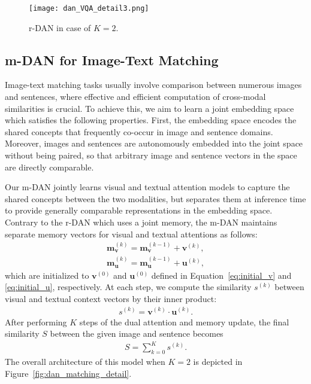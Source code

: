 \documentclass[10pt,twocolumn,letterpaper]{article}
\begin{document}
\begin{figure}[t]
\begin{center}
\texttt{[image: dan\_VQA\_detail3.png]}
\caption{
r-DAN in case of $K=2$.
}
\label{fig:dan_vqa_detail}
\vspace{-5mm}
\end{center}
\end{figure}

\subsection{m-DAN for Image-Text Matching}
\label{sub:matching}
Image-text matching tasks usually involve comparison between numerous images and sentences, where effective and efficient computation of cross-modal similarities is crucial.
To achieve this, we aim to learn a joint embedding space which satisfies the following properties.
First, the embedding space encodes the shared concepts that frequently co-occur in image and sentence domains.
Moreover, images and sentences are autonomously embedded into the joint space without being paired, so that arbitrary image and sentence vectors in the  space are directly comparable.





Our m-DAN jointly learns visual and textual attention models to capture the shared concepts between the two modalities, but separates them at inference time to provide generally comparable representations in the embedding space.
Contrary to the r-DAN which uses a joint memory, the m-DAN maintains separate memory vectors for visual and textual attentions as follows:
\begin{align}
\mathbf{m}_\mathbf{v}^{(k)} = \mathbf{m}_\mathbf{v}^{(k-1)} + \mathbf{v}^{(k)}, \\
\mathbf{m}_\mathbf{u}^{(k)} = \mathbf{m}_\mathbf{u}^{(k-1)} + \mathbf{u}^{(k)},
\label{eq:mem_matching}
\end{align}
which are initialized to $\mathbf{v}^{(0)}$ and $\mathbf{u}^{(0)}$ defined in Equation~\ref{eq:initial_v} and \ref{eq:initial_u}, respectively.
At each step, we compute the similarity $s^{(k)}$ between visual and textual context vectors by their inner product:
\begin{align}
s^{(k)} = \mathbf{v}^{(k)} \cdot \mathbf{u}^{(k)}.
\end{align}
After performing $K$ steps of the dual attention and memory update, the final similarity $S$ between the given image and sentence becomes
\begin{align}
S = \sum_{k=0}^{K} s^{(k)}.
\label{eq:sim}
\end{align}
The overall architecture of this model when $K=2$ is depicted in Figure~\ref{fig:dan_matching_detail}.
\end{document}

